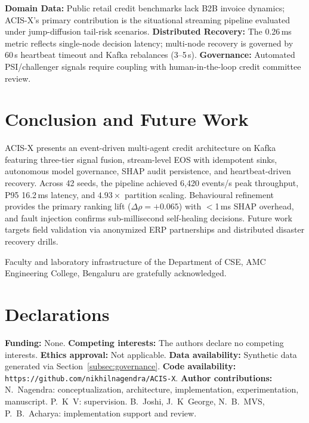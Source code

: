 \documentclass[pdflatex,sn-mathphys-num]{sn-jnl}
\theoremstyle{thmstyleone}
\theoremstyle{thmstyletwo}
\theoremstyle{thmstylethree}
\begin{document}
\textbf{Domain Data:} Public retail credit benchmarks lack B2B invoice dynamics; ACIS-X's primary contribution is the situational streaming pipeline evaluated under jump-diffusion tail-risk scenarios. \textbf{Distributed Recovery:} The 0.26\,ms metric reflects single-node decision latency; multi-node recovery is governed by 60\,s heartbeat timeout and Kafka rebalances (3--5\,s). \textbf{Governance:} Automated PSI/challenger signals require coupling with human-in-the-loop credit committee review.

\section{Conclusion and Future Work}\label{sec:conclusion}

ACIS-X presents an event-driven multi-agent credit architecture on Kafka featuring three-tier signal fusion, stream-level EOS with idempotent sinks, autonomous model governance, SHAP audit persistence, and heartbeat-driven recovery. Across 42 seeds, the pipeline achieved 6{,}420 events/s peak throughput, P95 16.2\,ms latency, and $4.93{\times}$ partition scaling. Behavioural refinement provides the primary ranking lift ($\Delta\rho{=}+0.065$) with $<$1\,ms SHAP overhead, and fault injection confirms sub-millisecond self-healing decisions. Future work targets field validation via anonymized ERP partnerships and distributed disaster recovery drills.

\backmatter

Faculty and laboratory infrastructure of the Department of CSE, AMC Engineering College, Bengaluru are gratefully acknowledged.

\section*{Declarations}
\small
\noindent\textbf{Funding:} None. \textbf{Competing interests:} The authors declare no competing interests. \textbf{Ethics approval:} Not applicable. \textbf{Data availability:} Synthetic data generated via Section~\ref{subsec:governance}. \textbf{Code availability:} \texttt{https://github.com/nikhilnagendra/ACIS-X}. \textbf{Author contributions:} N.~Nagendra: conceptualization, architecture, implementation, experimentation, manuscript. P.~K~V: supervision. B.~Joshi, J.~K~George, N.~B.~MVS, P.~B.~Acharya: implementation support and review.


\end{document}
